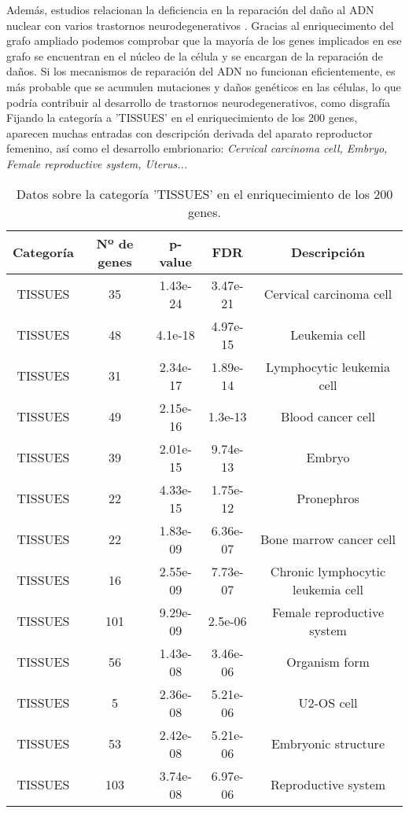 Además, estudios relacionan la deficiencia en la reparación del daño al ADN nuclear con varios trastornos neurodegenerativos \cite{Jeppesen2011}. Gracias al enriquecimento del grafo ampliado podemos comprobar que la mayoría de los genes implicados en ese grafo se encuentran en el núcleo de la célula y se encargan de la reparación de daños.  Si los mecanismos de reparación del ADN no funcionan eficientemente, es más probable que se acumulen mutaciones y daños genéticos en las células, lo que podría contribuir al desarrollo de trastornos neurodegenerativos, como disgrafía\\

Fijando la categoría a 'TISSUES' en el enriquecimiento de los 200 genes, aparecen muchas entradas con descripción derivada del aparato reproductor femenino, así como el desarrollo embrionario: \textit{ Cervical carcinoma cell, Embryo, Female reproductive system, Uterus... }

\begin{table}[h]
	\centering
	\caption{Datos sobre la categoría 'TISSUES' en el enriquecimiento de los 200 genes.}
	\label{tab:datos-tissues}
	\begin{tabular}{|c|c|c|c|c|}
		\hline
		\textbf{Categoría} & \textbf{Nº de genes} & \textbf{p-value} & \textbf{FDR} & \textbf{Descripción} \\
		\hline
		TISSUES & 35 & 1.43e-24 & 3.47e-21 & Cervical carcinoma cell \\
		TISSUES & 48 & 4.1e-18 & 4.97e-15 & Leukemia cell \\
		TISSUES & 31 & 2.34e-17 & 1.89e-14 & Lymphocytic leukemia cell \\
		TISSUES & 49 & 2.15e-16 & 1.3e-13 & Blood cancer cell \\
		TISSUES & 39 & 2.01e-15 & 9.74e-13 & Embryo \\
		TISSUES & 22 & 4.33e-15 & 1.75e-12 & Pronephros \\
		TISSUES & 22 & 1.83e-09 & 6.36e-07 & Bone marrow cancer cell \\
		TISSUES & 16 & 2.55e-09 & 7.73e-07 & Chronic lymphocytic leukemia cell \\
		TISSUES & 101 & 9.29e-09 & 2.5e-06 & Female reproductive system \\
		TISSUES & 56 & 1.43e-08 & 3.46e-06 & Organism form \\
		TISSUES & 5 & 2.36e-08 & 5.21e-06 & U2-OS cell \\
		TISSUES & 53 & 2.42e-08 & 5.21e-06 & Embryonic structure \\
		TISSUES & 103 & 3.74e-08 & 6.97e-06 & Reproductive system \\
		\hline
	\end{tabular}
	
\end{table}

